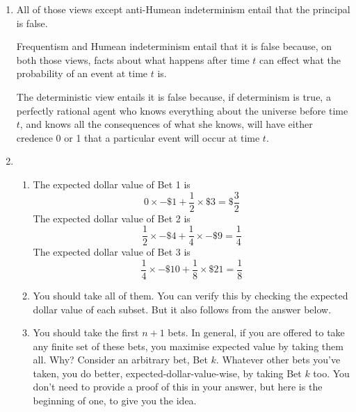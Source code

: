 \documentclass[12pt,a4paper]{article}
\begin{document}
\begin{enumerate}
\item  All of those views except anti-Humean indeterminism entail that the principal is false. 

Frequentism and Humean indeterminism entail that it is false because, on both those views, facts about what happens after time $t$ can effect what the probability of an event at time $t$ is. 

The deterministic view entails it is false because, if determinism is true, a perfectly rational agent who knows everything about the universe before time $t$, and knows all the consequences of what she knows, will have either credence 0 or 1 that a particular event will occur at time $t$.

\item \begin{enumerate}
	\item The expected dollar value of Bet 1 is $$0\times -\$1 + \frac{1}{2}\times\$3 = \$\frac{3}{2}$$ The expected dollar value of Bet 2 is $$\frac{1}{2}\times -\$4 + \frac{1}{4}\times -\$9 = \frac{1}{4}$$ The expected dollar value of Bet 3 is $$\frac{1}{4}\times -\$10 + \frac{1}{8}\times \$21 = \frac{1}{8}$$
	\item You should take all of them. You can verify this by checking the expected dollar value of each subset. But it also follows from the answer below.
	\item You should take the first $n+1$ bets. In general, if you are offered to take any finite set of these bets, you maximise expected value by taking them all. Why? Consider an arbitrary bet, Bet $k$. Whatever other bets you've taken, you do better, expected-dollar-value-wise, by taking Bet $k$ too. You don't need to provide a proof of this in your answer, but here is the beginning of one, to give you the idea.
	

\end{enumerate}
\end{enumerate}
\end{document}
